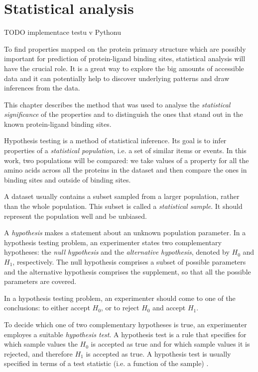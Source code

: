 \section{Statistical analysis}

TODO implementace testu v Pythonu

To find properties mapped on the protein primary structure which are possibly important for prediction of protein-ligand binding sites, statistical analysis will have the crucial role. It is a great way to explore the big amounts of accessible data and it can potentially help to discover underlying patterns and draw inferences from the data.

This chapter describes the method that was used to analyse the \textit{statistical significance} of the properties and to distinguish the ones that stand out in the known protein-ligand binding sites.



Hypothesis testing is a method of statistical inference. Its goal is to infer properties of a \textit{statistical population}, i.e. a set of similar items or events. In this work, two populations will be compared: we take values of a property for all the amino acids across all the proteins in the dataset and then compare the ones in binding sites and outside of binding sites.

A dataset usually contains a subset sampled from a larger population, rather than the whole population. This subset is called a \textit{statistical sample}. It should represent the population well and be unbiased.

A \textit{hypothesis} makes a statement about an unknown population parameter. In a hypothesis testing problem, an experimenter states two complementary hypotheses: the \textit{null hypothesis} and the \textit{alternative hypothesis}, denoted by $H_{0}$ and $H_{1}$, respectively. The null hypothesis comprises a subset of possible parameters and the alternative hypothesis comprises the supplement, so that all the possible parameters are covered.

In a hypothesis testing problem, an experimenter should come to one of the conclusions: to either accept $H_{0}$, or to reject $H_{0}$ and accept $H_{1}$.

To decide which one of two complementary hypotheses is true, an experimenter employes a suitable \textit{hypothesis test}. A hypothesis test is a rule that specifies for which sample values the $H_{0}$ is accepted as true and for which sample values it is rejected, and therefore $H_{1}$ is accepted as true. A hypothesis test is usually specified in terms of a test statistic (i.e. a function of the sample) \cite{casella}.

